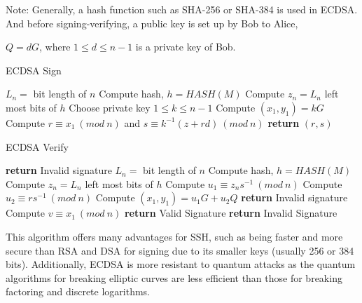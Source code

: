\par
\noindent Note: Generally, a hash function such as SHA-256 or SHA-384 is used in ECDSA. And before signing-verifying, a public key is set up by Bob to Alice, 
\begin{center}
$Q = dG$, where $1 \leq d \leq n-1$ is a private key of Bob.
\end{center}

\begin{algorithm}
\caption{ECDSA Sign}\label{ECDSA_sign}
\begin{algorithmic}[1]
\State $L_n = $ bit length of $n$
\State Compute hash, $h = HASH(M)$
\State Compute $z_n = L_n$ left most bits of $h$
\State Choose private key $1 \leq k \leq n-1$
\State Compute $(x_1, y_1) = kG$
\State Compute $r \equiv x_1\:(mod\:n)$ and $s \equiv k^{-1}(z + rd)\:(mod\:n)$
\EndWhile
\State \textbf{return} $(r, s)$
\EndProcedure
\end{algorithmic}
\end{algorithm}

\begin{algorithm}
\caption{ECDSA Verify}\label{ECDSA_verify}
\begin{algorithmic}[1]
\State \textbf{return} Invalid signature
\EndIf
\State $L_n = $ bit length of $n$
\State Compute hash, $h = HASH(M)$
\State Compute $z_n = L_n$ left most bits of $h$
\State Compute $u_1 \equiv z_ns^{-1} \: (mod \: n)$
\State Compute $u_2 \equiv rs^{-1} \: (mod \: n)$
\State Compute $(x_1, y_1) = u_1G + u_2Q$
\State \textbf{return} Invalid signature
\EndIf
\State Compute $v \equiv x_1 \: (mod \: n)$
\State \textbf{return} Valid Signature
\EndIf
\State \textbf{return} Invalid Signature
\EndProcedure
\end{algorithmic}
\end{algorithm}

\noindent This algorithm offers many advantages for SSH, such as being faster and more secure than RSA and DSA for signing due to its smaller keys (usually 256 or 384 bits). 
Additionally, ECDSA is more resistant to quantum attacks as the quantum algorithms for breaking elliptic curves are less efficient than those for breaking factoring and discrete logarithms. 

